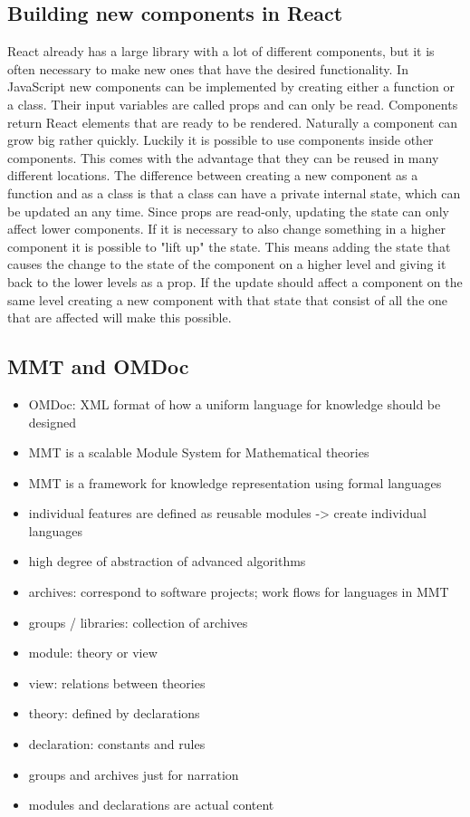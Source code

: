 \documentclass[11pt,a4paper]{article}
\begin{document}
	\subsection{Building new components in React}
	React already has a large library with a lot of different components, but it is often necessary to make new ones that have the desired functionality. In JavaScript new components can be implemented by creating either a function or a class. Their input variables are called props and can only be read. Components return React elements that are ready to be rendered. Naturally a component can grow big rather quickly. Luckily it is possible to use components inside other components. This comes with the advantage that they can be reused in many different locations. The difference between creating a new component as a function and as a class is that a class can have a private internal state, which can be updated an any time. Since props are read-only, updating the state can only affect lower components. If it is necessary to also change something in a higher component it is possible to "lift up" the state. This means adding the state that causes the change to the state of the component on a higher level and giving it back to the lower levels as a prop. If the update should affect a component on the same level creating a new component with that state that consist of all the one that are affected will  make this possible.
\cite{reactjsGS}

\subsection{MMT and OMDoc}
\begin{itemize}
\item OMDoc: XML format of how a uniform language for knowledge should be designed
\item MMT is a scalable Module System for Mathematical theories
\item MMT is a framework for knowledge representation using formal languages
\item individual features are defined as reusable modules -> create individual languages
\item high degree of abstraction of advanced algorithms
\item archives: correspond to software projects; work flows for languages in MMT
\item groups / libraries: collection of archives
\item module: theory or view
\item view: relations between theories
\item theory: defined by declarations
\item declaration: constants and rules
\item groups and archives just for narration
\item modules and declarations are actual content
\cite{mmt}
\end{itemize}
\end{document}

